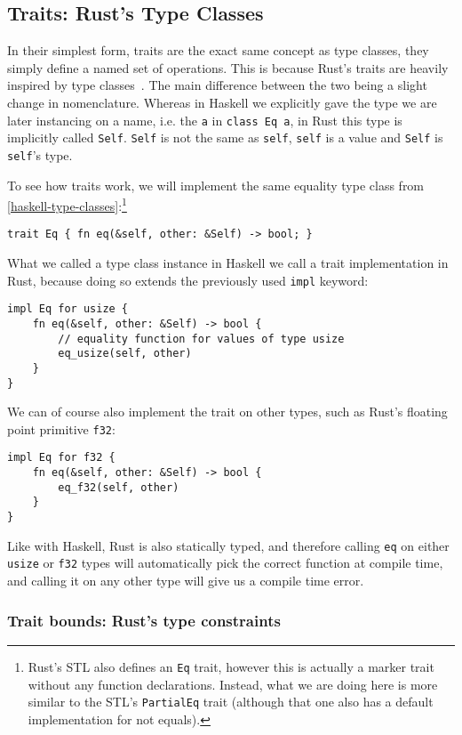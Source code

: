 \subsection{Traits: Rust's Type Classes}

In their simplest form, traits are the exact same concept as type classes, they simply define a named set of operations. This is because Rust's traits are heavily inspired by type classes~\cite[Chapter~20.2]{rust-reference}. The main difference between the two being a slight change in nomenclature. Whereas in Haskell we explicitly gave the type we are later instancing on a name, i.e. the \verb|a| in \verb|class Eq a|, in Rust this type is implicitly called \verb|Self|. \verb|Self| is not the same as \verb|self|, \verb|self| is a value and \verb|Self| is \verb|self|'s type.

To see how traits work, we will implement the same equality type class from \autoref{haskell-type-classes}:\footnote{Rust's STL also defines an \verb|Eq| trait, however this is actually a marker trait without any function declarations. Instead, what we are doing here is more similar to the STL's \verb|PartialEq| trait (although that one also has a default implementation for not equals).}
\begin{verbatim}
trait Eq { fn eq(&self, other: &Self) -> bool; }
\end{verbatim}
What we called a type class instance in Haskell we call a trait implementation in Rust, because doing so extends the previously used \verb|impl| keyword:
\begin{verbatim}
impl Eq for usize {
    fn eq(&self, other: &Self) -> bool {
        // equality function for values of type usize
        eq_usize(self, other)
    }
}
\end{verbatim}
We can of course also implement the trait on other types, such as Rust's floating point primitive \verb|f32|:
\begin{verbatim}
impl Eq for f32 {
    fn eq(&self, other: &Self) -> bool {
        eq_f32(self, other)
    }
}
\end{verbatim}

Like with Haskell, Rust is also statically typed, and therefore calling \verb|eq| on either \verb|usize| or \verb|f32| types will automatically pick the correct function at compile time, and calling it on any other type will give us a compile time error.

\subsubsection{Trait bounds: Rust's type constraints}

